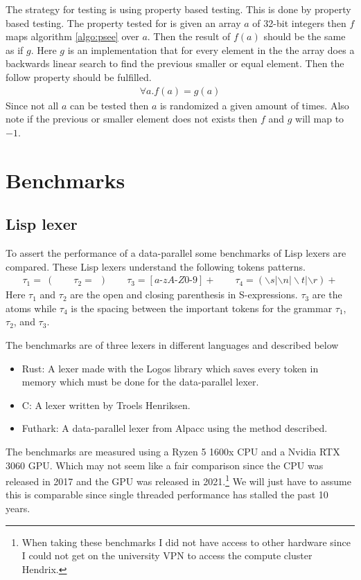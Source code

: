 \documentclass[a4paper,12pt]{article}
\theoremstyle{definition}
\begin{document}
The strategy for testing is using property based testing. This is done by property based testing. The property tested for is given an array $a$ of 32-bit integers then $f$ maps algorithm \ref{algo:psee} over $a$. Then the result of $f(a)$ should be the same as if $g$. Here $g$ is an implementation that for every element in the the array does a backwards linear search to find the previous smaller or equal element. Then the follow property should be fulfilled.
\begin{align*}
  \forall a. f(a) = g(a)
\end{align*}
Since not all $a$ can be tested then $a$ is randomized a given amount of times. Also note if the previous or smaller element does not exists then $f$ and $g$ will map to $-1$.

\section{Benchmarks}
\subsection{Lisp lexer}
To assert the performance of a data-parallel some benchmarks of Lisp lexers are compared. These Lisp lexers understand the following tokens patterns.
\begin{align*}
  \tau_1 = \: ( \qquad \tau_2 = \: \:) \qquad \tau_3 = [a\text{-}zA\text{-}Z0\text{-}9]+ \qquad \tau_4 = (\backslash s|\backslash n |\backslash t | \backslash r)+
\end{align*}
Here $\tau_1$ and $\tau_2$ are the open and closing parenthesis in S-expressions. $\tau_3$ are the atoms while $\tau_4$ is the spacing between the important tokens for the grammar $\tau_1$, $\tau_2$, and $\tau_3$.

The benchmarks are of three lexers in different languages and described below
\begin{itemize}
  \item Rust: A lexer made with the Logos library which saves every token in memory which must be done for the data-parallel lexer.
  \item C: A lexer written by Troels Henriksen. 
  \item Futhark: A data-parallel lexer from Alpacc \cite{due2023} using the method described.
\end{itemize}
The benchmarks are measured using a Ryzen 5 1600x CPU and a Nvidia RTX 3060 GPU. Which may not seem like a fair comparison since the CPU was released in 2017 and the GPU was released in 2021.\footnote{When taking these benchmarks I did not have access to other hardware since I could not get on the university VPN to access the compute cluster Hendrix.} We will just have to assume this is comparable since single threaded performance has stalled the past 10 years.
\end{document}
